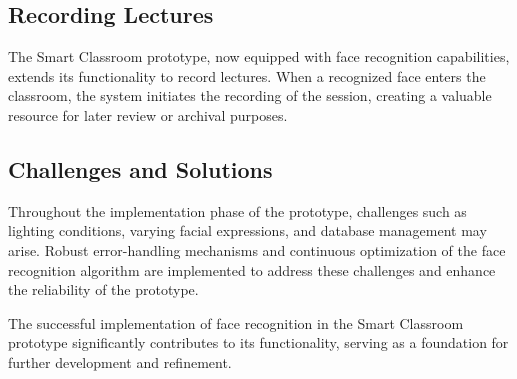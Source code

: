\documentclass[11pt]{article}
\begin{document}
	\hspace{1cm} \subsection{Recording Lectures}
	\hspace{1cm} The Smart Classroom prototype, now equipped with face recognition capabilities, extends its functionality to record lectures. When a recognized face enters the classroom, the system initiates the recording of the session, creating a valuable resource for later review or archival purposes.
	
	\hspace{1cm} \subsection{Challenges and Solutions}
	\hspace{1cm} Throughout the implementation phase of the prototype, challenges such as lighting conditions, varying facial expressions, and database management may arise. Robust error-handling mechanisms and continuous optimization of the face recognition algorithm are implemented to address these challenges and enhance the reliability of the prototype.
	
	\hspace{1cm} The successful implementation of face recognition in the Smart Classroom prototype significantly contributes to its functionality, serving as a foundation for further development and refinement.
	
	\pagebreak
	
\end{document}
